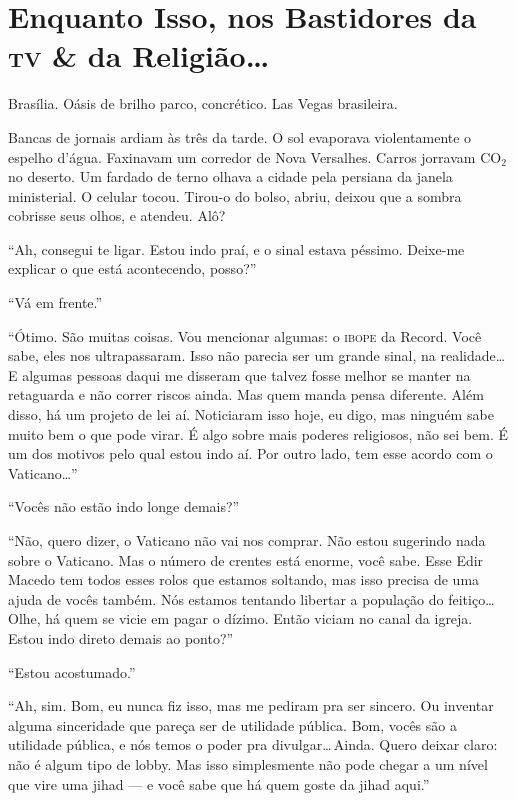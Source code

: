 \chapter[Nos Bastidores da \textsc{tv} e da Religião]{Enquanto Isso, nos Bastidores da \textsc{tv} \& da Religião\ldots}

Brasília. Oásis de brilho parco, concrético. Las Vegas brasileira.

Bancas de jornais ardiam às três da tarde. O sol evaporava violentamente o espelho d'água. Faxinavam um corredor de Nova Versalhes. Carros jorravam $\textrm{CO}_{2}$ no deserto. Um fardado de terno olhava a cidade pela persiana da janela ministerial. O celular tocou. Tirou-o do bolso, abriu, deixou que a sombra cobrisse seus olhos, e atendeu. Alô?

``Ah, consegui te ligar. Estou indo praí, e o sinal estava péssimo. Deixe-me explicar o que está acontecendo, posso?''

``Vá em frente.''

``Ótimo. São muitas coisas. Vou mencionar algumas: o \textsc{ibope} da Record. Você sabe, eles nos ultrapassaram. Isso não parecia ser um grande sinal, na realidade\ldots\,E algumas pessoas daqui me disseram que talvez fosse melhor se manter na retaguarda e não correr riscos ainda. Mas quem manda pensa diferente. Além disso, há um projeto de lei aí. Noticiaram isso hoje, eu digo, mas ninguém sabe muito bem o que pode virar. É algo sobre mais poderes religiosos, não sei bem. É um dos motivos pelo qual estou indo aí. Por outro lado, tem esse acordo com o Vaticano\ldots''

``Vocês não estão indo longe demais?''

``Não, quero dizer, o Vaticano não vai nos comprar. Não estou sugerindo nada sobre o Vaticano. Mas o número de crentes está enorme, você sabe. Esse Edir Macedo tem todos esses rolos que estamos soltando, mas isso precisa de uma ajuda de vocês também. Nós estamos tentando libertar a população do feitiço\ldots\,Olhe, há quem se vicie em pagar o dízimo. Então viciam no canal da igreja. Estou indo direto demais ao ponto?''

``Estou acostumado.''

``Ah, sim. Bom, eu nunca fiz isso, mas me pediram pra ser sincero. Ou inventar alguma sinceridade que pareça ser de utilidade pública. Bom, vocês são a utilidade pública, e nós temos o poder pra divulgar\ldots\,Ainda. Quero deixar claro: não é algum tipo de lobby. Mas isso simplesmente não pode chegar a um nível que vire uma jihad --- e você sabe que há quem goste da jihad aqui.''

